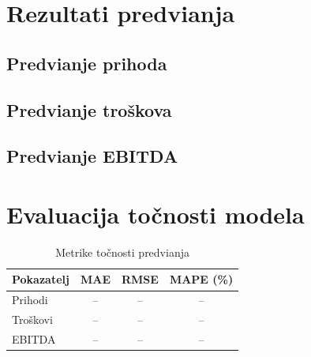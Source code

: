 \documentclass[zavrsnirad]{fer}
\begin{document}

\section{Rezultati predvi\dj anja}
\label{sec:rezultati_predvidjanja}


\subsection{Predvi\dj anje prihoda}
\label{subsec:predvidjanje_prihoda}


\subsection{Predvi\dj anje tro\v{s}kova}
\label{subsec:predvidjanje_troskova}


\subsection{Predvi\dj anje EBITDA}
\label{subsec:predvidjanje_ebitda}


\section{Evaluacija to\v{c}nosti modela}
\label{sec:evaluacija}


\begin{table}[htb]
  \centering
  \caption{Metrike to\v{c}nosti predvi\dj anja}
  \label{tab:metrike_tocnosti}
  \begin{tabular}{lccc}
    \toprule
    \textbf{Pokazatelj} & \textbf{MAE} & \textbf{RMSE} & \textbf{MAPE (\%)} \\
    \midrule
    Prihodi & -- & -- & -- \\
    Tro\v{s}kovi & -- & -- & -- \\
    EBITDA & -- & -- & -- \\
    \bottomrule
  \end{tabular}
\end{table}
\end{document}
